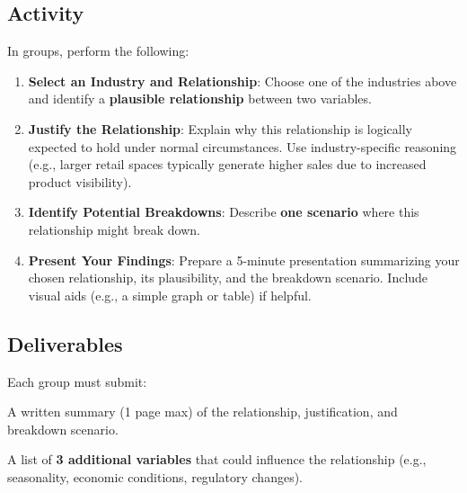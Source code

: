 \documentclass[11pt,a4paper,openany]{memoir}
\begin{document}
\subsection*{Activity}
In groups, perform the following:
\begin{enumerate}
    \item \textbf{Select an Industry and Relationship}:
    Choose one of the industries above and identify a \textbf{plausible relationship} between two variables. 

    \item \textbf{Justify the Relationship}:
    Explain why this relationship is logically expected to hold under normal circumstances. Use industry-specific reasoning (e.g., larger retail spaces typically generate higher sales due to increased product visibility).

    \item \textbf{Identify Potential Breakdowns}:
    Describe \textbf{one scenario} where this relationship might break down. 

    \item \textbf{Present Your Findings}:
    Prepare a 5-minute presentation summarizing your chosen relationship, its plausibility, and the breakdown scenario. Include visual aids (e.g., a simple graph or table) if helpful.
\end{enumerate}

\subsection*{Deliverables}
Each group must submit:
\begin{compactitem}
    \item A written summary (1 page max) of the relationship, justification, and breakdown scenario.
    \item A list of \textbf{3 additional variables} that could influence the relationship (e.g., seasonality, economic conditions, regulatory changes).
\end{compactitem}
\end{document}
